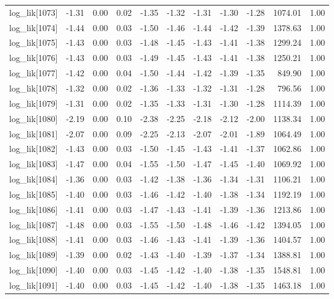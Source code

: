 \begin{table}[ht]
\begin{tabular}{rrrrrrrrrrr}
  log\_lik[1073] & -1.31 & 0.00 & 0.02 & -1.35 & -1.32 & -1.31 & -1.30 & -1.28 & 1074.01 & 1.00 \\ 
  log\_lik[1074] & -1.44 & 0.00 & 0.03 & -1.50 & -1.46 & -1.44 & -1.42 & -1.39 & 1378.63 & 1.00 \\ 
  log\_lik[1075] & -1.43 & 0.00 & 0.03 & -1.48 & -1.45 & -1.43 & -1.41 & -1.38 & 1299.24 & 1.00 \\ 
  log\_lik[1076] & -1.43 & 0.00 & 0.03 & -1.49 & -1.45 & -1.43 & -1.41 & -1.38 & 1250.21 & 1.00 \\ 
  log\_lik[1077] & -1.42 & 0.00 & 0.04 & -1.50 & -1.44 & -1.42 & -1.39 & -1.35 & 849.90 & 1.00 \\ 
  log\_lik[1078] & -1.32 & 0.00 & 0.02 & -1.36 & -1.33 & -1.32 & -1.31 & -1.28 & 796.56 & 1.00 \\ 
  log\_lik[1079] & -1.31 & 0.00 & 0.02 & -1.35 & -1.33 & -1.31 & -1.30 & -1.28 & 1114.39 & 1.00 \\ 
  log\_lik[1080] & -2.19 & 0.00 & 0.10 & -2.38 & -2.25 & -2.18 & -2.12 & -2.00 & 1138.34 & 1.00 \\ 
  log\_lik[1081] & -2.07 & 0.00 & 0.09 & -2.25 & -2.13 & -2.07 & -2.01 & -1.89 & 1064.49 & 1.00 \\ 
  log\_lik[1082] & -1.43 & 0.00 & 0.03 & -1.50 & -1.45 & -1.43 & -1.41 & -1.37 & 1062.86 & 1.00 \\ 
  log\_lik[1083] & -1.47 & 0.00 & 0.04 & -1.55 & -1.50 & -1.47 & -1.45 & -1.40 & 1069.92 & 1.00 \\ 
  log\_lik[1084] & -1.36 & 0.00 & 0.03 & -1.42 & -1.38 & -1.36 & -1.34 & -1.31 & 1106.21 & 1.00 \\ 
  log\_lik[1085] & -1.40 & 0.00 & 0.03 & -1.46 & -1.42 & -1.40 & -1.38 & -1.34 & 1192.19 & 1.00 \\ 
  log\_lik[1086] & -1.41 & 0.00 & 0.03 & -1.47 & -1.43 & -1.41 & -1.39 & -1.36 & 1213.86 & 1.00 \\ 
  log\_lik[1087] & -1.48 & 0.00 & 0.03 & -1.55 & -1.50 & -1.48 & -1.46 & -1.42 & 1394.05 & 1.00 \\ 
  log\_lik[1088] & -1.41 & 0.00 & 0.03 & -1.46 & -1.43 & -1.41 & -1.39 & -1.36 & 1404.57 & 1.00 \\ 
  log\_lik[1089] & -1.39 & 0.00 & 0.02 & -1.43 & -1.40 & -1.39 & -1.37 & -1.34 & 1388.81 & 1.00 \\ 
  log\_lik[1090] & -1.40 & 0.00 & 0.03 & -1.45 & -1.42 & -1.40 & -1.38 & -1.35 & 1548.81 & 1.00 \\ 
  log\_lik[1091] & -1.40 & 0.00 & 0.03 & -1.45 & -1.42 & -1.40 & -1.38 & -1.35 & 1463.18 & 1.00 \\ 

\end{tabular}
\end{table}
